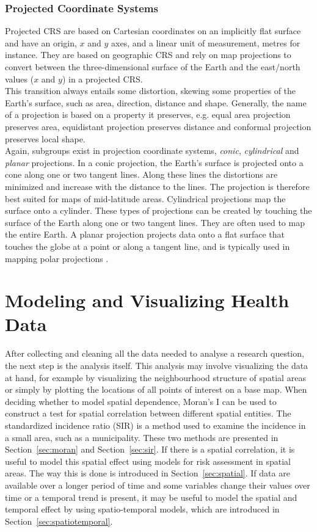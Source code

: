 \subsubsection{Projected Coordinate Systems}
Projected CRS are based on Cartesian coordinates on an implicitly flat surface and have an origin, $x$ and $y$ axes, and a linear unit of measurement, metres for instance. They are based on geographic CRS and rely on map projections to convert between the three-dimensional surface of the Earth and the east/north values ($x$ and $y$) in a projected CRS.\\
This transition always entails some distortion, skewing some properties of the Earth's surface, such as area, direction, distance and shape. Generally, the name of a projection is based on a property it preserves, e.g. equal area projection preserves area, equidistant projection preserves distance and conformal projection preserves local shape. \\
Again, subgroups exist in projection coordinate systems, \textit{conic}, \textit{cylindrical} and \textit{planar} projections. In a conic projection, the Earth's surface is projected onto a cone along one or two tangent lines. Along these lines the distortions are minimized and increase with the distance to the lines. The projection is therefore best suited for maps of mid-latitude areas. Cylindrical projections map the surface onto a cylinder. These types of projections can be created by touching the surface of the Earth along one or two tangent lines. They are often used to map the entire Earth. A planar projection projects data onto a flat surface that touches the globe at a point or along a tangent line, and is typically used in mapping polar projections \autocite[][]{lovelace2019geocomputation}.
\clearpage
\section{Modeling and Visualizing Health Data}
After collecting and cleaning all the data needed to analyse a research question, the next step is the analysis itself. This analysis may involve visualizing the data at hand, for example by visualizing the neighbourhood structure of spatial areas or simply by plotting the locations of all points of interest on a base map. When deciding whether to model spatial dependence, Moran's I \autocite[][]{moran1950notes} can be used to construct a test for spatial correlation between different spatial entities. The standardized incidence ratio (SIR) is a method used to examine the incidence in a small area, such as a municipality. These two methods are presented in Section~\ref{sec:moran} and Section~\ref{sec:sir}. If there is a spatial correlation, it is useful to model this spatial effect using models for risk assessment in spatial areas. The way this is done is introduced in Section~\ref{sec:spatial}. If data are available over a longer period of time and some variables change their values over time or a temporal trend is present, it may be useful to model the spatial and temporal effect by using spatio-temporal models, which are introduced in Section~\ref{sec:spatiotemporal}.
